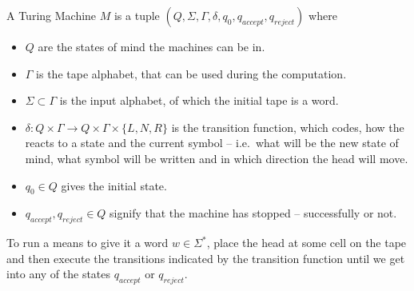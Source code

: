 \begin{defn}
	\label{def:tm}
	A Turing Machine $M$ is a tuple $(Q, \Sigma, \Gamma, \delta, q_0, q_{accept}, q_{reject})$
	where 
	\begin{itemize}
		\item $Q$ are the states of mind the machines can be in.
		\item $\Gamma$ is the tape alphabet, that can be used during the computation.
		\item $\Sigma\subset \Gamma$ is the input alphabet, of which the initial tape is a word.
		\item $\delta:Q\times \Gamma \rightarrow Q\times \Gamma\times \{L, N, R\}$ 
			is the transition function, which codes, how the \TM reacts to a state 
			and the current symbol -- i.e.\ what will be the new state of mind, what 
			symbol will be written and in which direction the head will move.
		\item $q_0\in Q$ gives the initial state.
		\item $q_{accept}, q_{reject}\in Q$ signify that the machine has stopped --
			successfully or not.
	\end{itemize}
\end{defn}

To run a \TM means to give it a word $w\in\Sigma^*$, place the head at some 
cell on the tape and then execute the transitions indicated by the transition
function until we get into any of the states $q_{accept}$ or $q_{reject}$.

